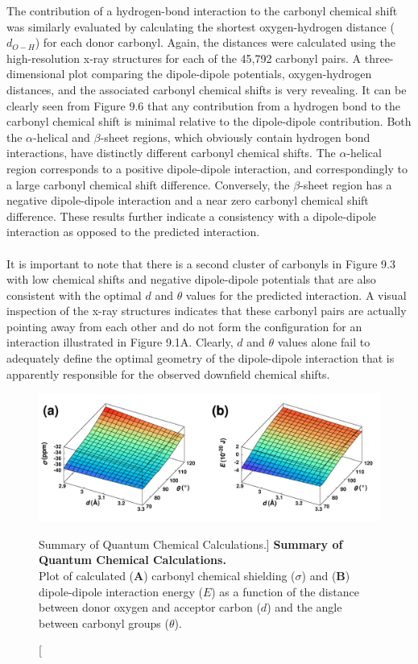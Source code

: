 \begin{doublespace}
The contribution of a hydrogen-bond interaction to the carbonyl \cnmr{}
chemical shift was similarly evaluated by calculating the shortest
oxygen-hydrogen distance ($d_{O-H}$) for each donor carbonyl. Again, the
distances were calculated using the high-resolution x-ray structures for each
of the 45,792 carbonyl pairs. A three-dimensional plot comparing the
dipole-dipole potentials, oxygen-hydrogen distances, and the associated
carbonyl \cnmr{} chemical shifts is very revealing. It can be clearly seen
from Figure 9.6 that any contribution from a hydrogen bond to the \cnmr{}
carbonyl chemical shift is minimal relative to the dipole-dipole contribution.
Both the $\alpha$-helical and $\beta$-sheet regions, which obviously contain
hydrogen bond interactions, have distinctly different \cnmr{} carbonyl chemical
shifts. The $\alpha$-helical region corresponds to a positive dipole-dipole
interaction, and correspondingly to a large carbonyl \cnmr{} chemical shift
difference. Conversely, the $\beta$-sheet region has a negative dipole-dipole
interaction and a near zero carbonyl \cnmr{} chemical shift difference. These
results further indicate a consistency with a dipole-dipole interaction as
opposed to the predicted \npistar{} interaction.
\\\\
It is important to note that there is a second cluster of carbonyls in Figure
9.3 with low \cnmr{} chemical shifts and negative dipole-dipole potentials that
are also consistent with the optimal $d$ and $\theta$ values for the predicted
\npistar{} interaction. A visual inspection of the x-ray structures indicates
that these carbonyl pairs are actually pointing away from each other and do not
form the configuration for an \npistar{} interaction illustrated in Figure
9.1A. Clearly, $d$ and $\theta$ values alone fail to adequately define the
optimal geometry of the dipole-dipole interaction that is apparently
responsible for the observed downfield \cnmr{} chemical shifts.
\end{doublespace}

\begin{figure}[h!]
\includegraphics[width=6.5in]{figs/npistar/07.png}
\caption
      [Summary of Quantum Chemical Calculations.]{
  {\bf Summary of Quantum Chemical Calculations.}
  \\
  Plot of calculated ({\bf A}) carbonyl \cnmr{} chemical shielding ($\sigma$)
  and ({\bf B}) dipole-dipole interaction energy ($E$) as a function of the
  distance between donor oxygen and acceptor carbon ($d$) and the angle
  between carbonyl groups ($\theta$).
}
\end{figure}

